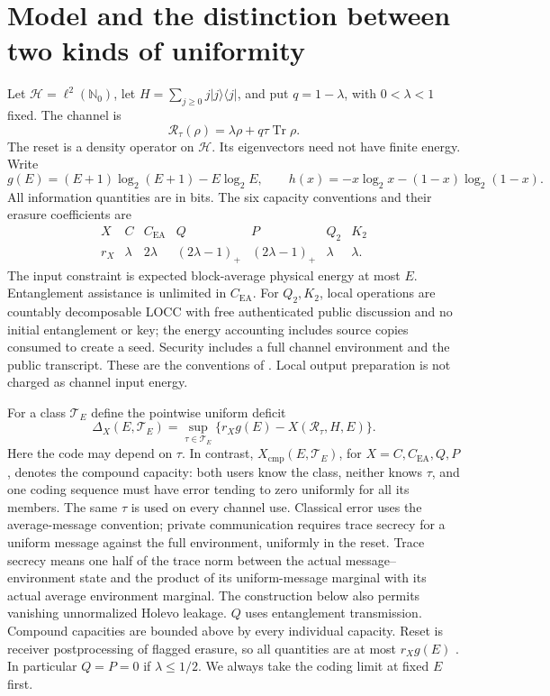 \documentclass[11pt]{article}
\newcommand{\Tr}{\operatorname{Tr}}
\newcommand{\CEA}{C_{\mathrm{EA}}}
\newcommand{\Rcal}{\mathcal R}
\newcommand{\Tcal}{\mathcal T}
\newcommand{\comp}{\mathrm{cmp}}
\begin{document}
\section{Model and the distinction between two kinds of uniformity}
Let \(\mathcal H=\ell^2(\mathbb N_0)\), let
\(H=\sum_{j\ge0}j|j\rangle\langle j|\), and put \(q=1-\lambda\), with
\(0<\lambda<1\) fixed. The channel is
\[
 \Rcal_\tau(\rho)=\lambda\rho+q\tau\Tr\rho .
\]
The reset is a density operator on \(\mathcal H\). Its eigenvectors need
not have finite energy. Write
\[
 g(E)=(E+1)\log_2(E+1)-E\log_2E,\qquad
 h(x)=-x\log_2x-(1-x)\log_2(1-x).
\]
All information quantities are in bits. The six capacity conventions and
their erasure coefficients are
\[
\begin{array}{c|cccccc}
 X&C&\CEA&Q&P&Q_2&K_2\\ \hline
 r_X&\lambda&2\lambda&(2\lambda-1)_+&(2\lambda-1)_+&\lambda&\lambda .
\end{array}                                                    \tag{1}
\]
The input constraint is expected block-average physical energy at most
\(E\). Entanglement assistance is unlimited in \(\CEA\).
For \(Q_2,K_2\), local operations are countably decomposable LOCC with
free authenticated public discussion and no initial entanglement or key;
the energy accounting includes source copies consumed to create a seed.
Security includes a full channel environment and the public transcript.
These are the conventions of \cite{prior,dsw}. Local output preparation
is not charged as channel input energy.

For a class \(\Tcal_E\) define the pointwise uniform deficit
\[
 \Delta_X(E,\Tcal_E)=
 \sup_{\tau\in\Tcal_E}\{r_Xg(E)-X(\Rcal_\tau,H,E)\}.              \tag{2}
\]
Here the code may depend on \(\tau\).
In contrast, \(X_\comp(E,\Tcal_E)\), for \(X=C,\CEA,Q,P\), denotes the
compound capacity: both users know the class, neither knows \(\tau\),
and one coding sequence must have error tending to zero uniformly for
all its members. The same \(\tau\) is used on every channel use.
Classical error uses the average-message convention; private communication
requires trace secrecy for a uniform message against the full environment,
uniformly in the reset. Trace secrecy means one half of the trace norm
between the actual message--environment state and the product of its
uniform-message marginal with its actual average environment marginal.
The construction below also permits vanishing
unnormalized Holevo leakage. \(Q\) uses entanglement transmission.
Compound capacities are bounded
above by every individual capacity. Reset is receiver postprocessing of
flagged erasure, so all quantities are at most \(r_Xg(E)\)
\cite{prior,dsw}. In particular \(Q=P=0\) if \(\lambda\le1/2\).
We always take the coding limit at fixed \(E\) first.
\end{document}
